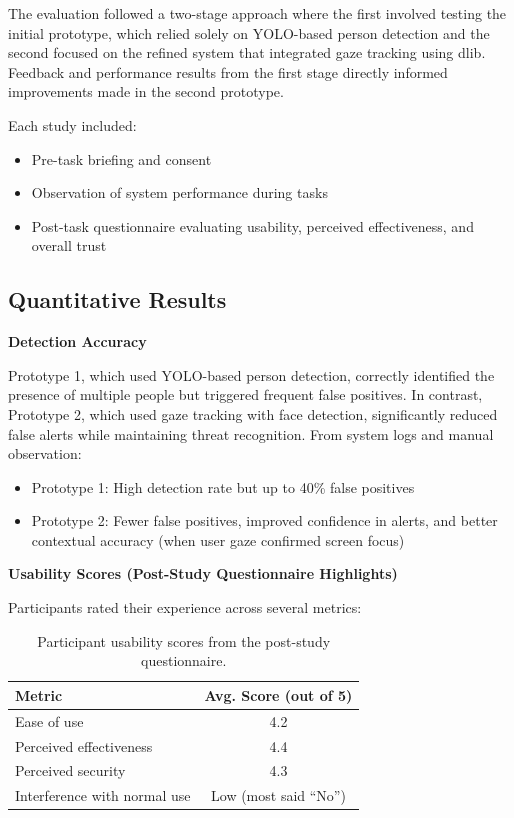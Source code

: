 \documentclass[12pt]{article}
\theoremstyle{plain}
\theoremstyle{definition}
\begin{document}
The evaluation followed a two-stage approach where the first involved testing the initial prototype, which relied solely on YOLO-based person detection and the second focused on the refined system that integrated gaze tracking using dlib. Feedback and performance results from the first stage directly informed improvements made in the second prototype.

Each study included:
\begin{itemize}
    \item Pre-task briefing and consent
    \item Observation of system performance during tasks
    \item Post-task questionnaire evaluating usability, perceived effectiveness, and overall trust
\end{itemize}

\subsection{Quantitative Results}

\textbf{Detection Accuracy}

Prototype 1, which used YOLO-based person detection, correctly identified the presence of multiple people but triggered frequent false positives. In contrast, Prototype 2, which used gaze tracking with face detection, significantly reduced false alerts while maintaining threat recognition.
From system logs and manual observation:
\begin{itemize}
    \item Prototype 1: High detection rate but up to 40\% false positives
    \item Prototype 2: Fewer false positives, improved confidence in alerts, and better contextual accuracy (when user gaze confirmed screen focus)
\end{itemize}

\textbf{Usability Scores (Post-Study Questionnaire Highlights)}

Participants rated their experience across several metrics:
\begin{table}[h!]
\centering
\begin{tabular}{|l|c|}
\hline
\textbf{Metric} & \textbf{Avg. Score (out of 5)} \\
\hline
Ease of use & 4.2 \\
Perceived effectiveness & 4.4 \\
Perceived security & 4.3 \\
Interference with normal use & Low (most said “No”) \\
\hline
\end{tabular}
\caption{Participant usability scores from the post-study questionnaire.}
\label{tab:usability_scores}
\end{table}
\end{document}
